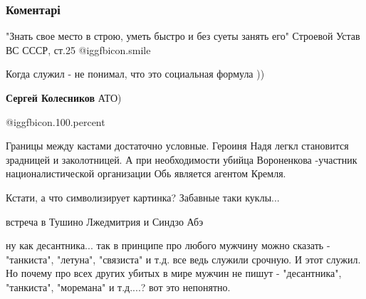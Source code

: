  
 
 
 
 
\subsubsection{Коментарі}

\begin{itemize} %

"Знать свое место в строю, уметь быстро и без суеты занять его"
Строевой Устав ВС СССР, ст.25
 @igg{fbicon.smile} 

\begin{itemize} %
Когда служил - не понимал, что это социальная формула ))

\textbf{Сергей Колесников} АТО)
\end{itemize} %

 @igg{fbicon.100.percent} 


Границы между кастами достаточно условные. Героиня Надя легкл становится
зрадницей и заколотницей. А при необходимости убийца Вороненкова -участник
националистической организации Обь является агентом Кремля.

Кстати, а что символизирует картинка? Забавные таки куклы...

\begin{itemize} %
встреча в Тушино Лжедмитрия и Синдзо Абэ
\end{itemize} %


ну как десантника... так в принципе про любого мужчину можно сказать -
"танкиста", "летуна", "связиста" и т.д. все ведь служили срочную. И этот
служил. Но почему про всех других убитых в мире мужчин не пишут - "десантника",
"танкиста", "моремана" и т.д....? вот это непонятно.

\end{itemize} %
